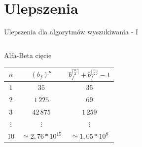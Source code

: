 \section{Ulepszenia}\label{sec:ulepszenia-dla-silnika}

\begin{frame}{Ulepszenia dla algorytmów wyszukiwania - I}

    \begin{columns}
            \begin{block}{Alfa-Beta cięcie}
                \begin{table}[] \tiny
                \centering
                \label{tab:alfa-beat-limit}
                \renewcommand{\arraystretch}{1.5}
                \begin{tabular}{|c|c|c|}\hline
                $n$ & $({b_{f}})^{n}$ & $b_{f}^{\lceil \frac{n}{2} \rceil} + b_{f}^{\lfloor \frac{n}{2} \rfloor} - 1$\\ \hline\hline

                $1$ & $35$ & $35$\\ \hline
                $2$ & $1\,225$ & $69$\\ \hline
                $3$ & $42\,875$ & $1\,259$\\ \hline
                $\vdots$ & $\vdots$ & $\vdots$\\ \hline
                $10$ & $\simeq2,76 * 10^{15}$ & $\simeq1,05 * 10^{8}$\\ \hline


\end{tabular}
\end{table}
\end{block}
\end{columns}
\end{frame}
